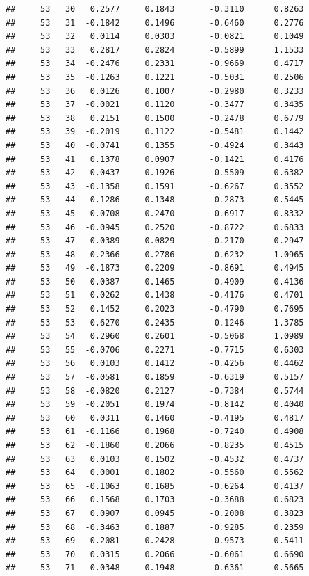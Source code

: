 \documentclass[
]{article}
\begin{document}
\begin{verbatim}
##     53   30   0.2577     0.1843       -0.3110      0.8263  
##     53   31  -0.1842     0.1496       -0.6460      0.2776  
##     53   32   0.0114     0.0303       -0.0821      0.1049  
##     53   33   0.2817     0.2824       -0.5899      1.1533  
##     53   34  -0.2476     0.2331       -0.9669      0.4717  
##     53   35  -0.1263     0.1221       -0.5031      0.2506  
##     53   36   0.0126     0.1007       -0.2980      0.3233  
##     53   37  -0.0021     0.1120       -0.3477      0.3435  
##     53   38   0.2151     0.1500       -0.2478      0.6779  
##     53   39  -0.2019     0.1122       -0.5481      0.1442  
##     53   40  -0.0741     0.1355       -0.4924      0.3443  
##     53   41   0.1378     0.0907       -0.1421      0.4176  
##     53   42   0.0437     0.1926       -0.5509      0.6382  
##     53   43  -0.1358     0.1591       -0.6267      0.3552  
##     53   44   0.1286     0.1348       -0.2873      0.5445  
##     53   45   0.0708     0.2470       -0.6917      0.8332  
##     53   46  -0.0945     0.2520       -0.8722      0.6833  
##     53   47   0.0389     0.0829       -0.2170      0.2947  
##     53   48   0.2366     0.2786       -0.6232      1.0965  
##     53   49  -0.1873     0.2209       -0.8691      0.4945  
##     53   50  -0.0387     0.1465       -0.4909      0.4136  
##     53   51   0.0262     0.1438       -0.4176      0.4701  
##     53   52   0.1452     0.2023       -0.4790      0.7695  
##     53   53   0.6270     0.2435       -0.1246      1.3785  
##     53   54   0.2960     0.2601       -0.5068      1.0989  
##     53   55  -0.0706     0.2271       -0.7715      0.6303  
##     53   56   0.0103     0.1412       -0.4256      0.4462  
##     53   57  -0.0581     0.1859       -0.6319      0.5157  
##     53   58  -0.0820     0.2127       -0.7384      0.5744  
##     53   59  -0.2051     0.1974       -0.8142      0.4040  
##     53   60   0.0311     0.1460       -0.4195      0.4817  
##     53   61  -0.1166     0.1968       -0.7240      0.4908  
##     53   62  -0.1860     0.2066       -0.8235      0.4515  
##     53   63   0.0103     0.1502       -0.4532      0.4737  
##     53   64   0.0001     0.1802       -0.5560      0.5562  
##     53   65  -0.1063     0.1685       -0.6264      0.4137  
##     53   66   0.1568     0.1703       -0.3688      0.6823  
##     53   67   0.0907     0.0945       -0.2008      0.3823  
##     53   68  -0.3463     0.1887       -0.9285      0.2359  
##     53   69  -0.2081     0.2428       -0.9573      0.5411  
##     53   70   0.0315     0.2066       -0.6061      0.6690  
##     53   71  -0.0348     0.1948       -0.6361      0.5665  

\end{verbatim}
\end{document}
